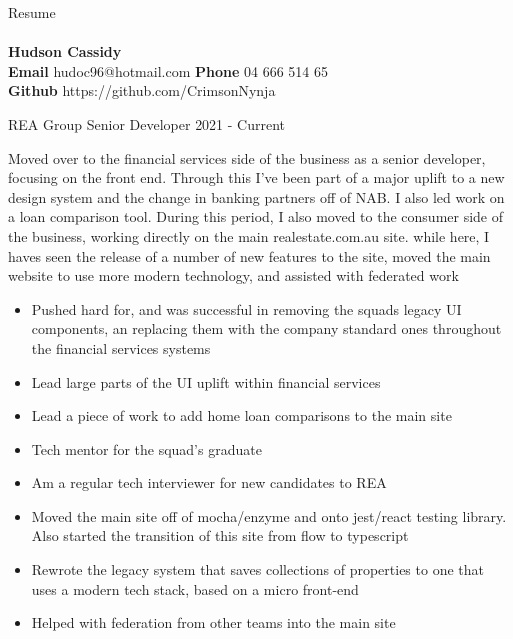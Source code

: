 \documentclass[8pt]{developercv}
\begin{document}
	\begin{minipage}[a]{1.0\textwidth}
		\begin{center}	%
			{\HUGE Resume}\\
			\textbf{}\\
			\textbf {Hudson Cassidy} \\
			\textbf {Email} hudoc96@hotmail.com
			\textbf {Phone} 04 666 514 65 \\
			\textbf {Github} https://github.com/CrimsonNynja \\
		\end{center}
	\end{minipage}
	\begin{minipage}[t]{0.7\textwidth}
		\begin{entrylist}	%
			\entry
				{REA Group}
				{Senior Developer}
				{2021 - Current}
				{Moved over to the financial services side of the business as a senior developer, focusing on the front end. Through this I've been part of a major uplift to a new design system and the change in banking partners off of NAB. I also led work on a loan comparison tool. 
			During this period, I also moved to the consumer side of the business, working directly on the main realestate.com.au site. while here, I haves seen the release of a number of new features to the site, moved the main website to use more modern technology, and assisted with federated work
				\begin{itemize}
					\item Pushed hard for, and was successful in removing the squads legacy UI components, an replacing them with the company standard ones throughout the financial services systems
					\item Lead large parts of the UI uplift within financial services
					\item Lead a piece of work to add home loan comparisons to the main site
					\item Tech mentor for the squad's graduate
					\item Am a regular tech interviewer for new candidates to REA
					\item Moved the main site off of mocha/enzyme and onto jest/react testing library. Also started the transition of this site from flow to typescript
					\item Rewrote the legacy system that saves collections of properties to one that uses a modern tech stack, based on a micro front-end
					\item Helped with federation from other teams into the main site

\end{itemize}}
\end{entrylist}
\end{minipage}
\end{document}

